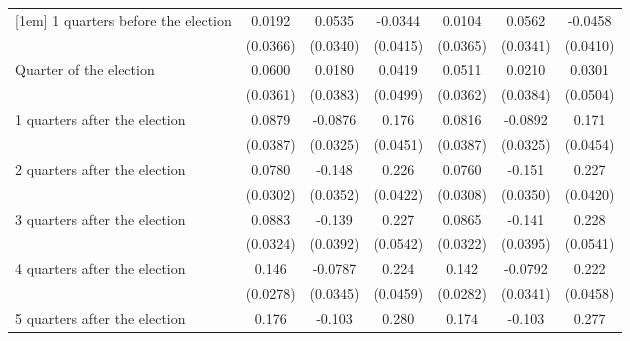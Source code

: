 \begin{table}[!ht]
\begin{tabular}{l*{6}{c}}
[1em]
 1 quarters before the election&      0.0192         &      0.0535         &     -0.0344         &      0.0104         &      0.0562         &     -0.0458         \\
                    &    (0.0366)         &    (0.0340)         &    (0.0415)         &    (0.0365)         &    (0.0341)         &    (0.0410)         \\
[1em]
Quarter of the election&      0.0600         &      0.0180         &      0.0419         &      0.0511         &      0.0210         &      0.0301         \\
                    &    (0.0361)         &    (0.0383)         &    (0.0499)         &    (0.0362)         &    (0.0384)         &    (0.0504)         \\
[1em]
 1 quarters after the election&      0.0879\sym{*}  &     -0.0876\sym{**} &       0.176\sym{***}&      0.0816\sym{*}  &     -0.0892\sym{**} &       0.171\sym{***}\\
                    &    (0.0387)         &    (0.0325)         &    (0.0451)         &    (0.0387)         &    (0.0325)         &    (0.0454)         \\
[1em]
 2 quarters after the election&      0.0780\sym{**} &      -0.148\sym{***}&       0.226\sym{***}&      0.0760\sym{*}  &      -0.151\sym{***}&       0.227\sym{***}\\
                    &    (0.0302)         &    (0.0352)         &    (0.0422)         &    (0.0308)         &    (0.0350)         &    (0.0420)         \\
[1em]
 3 quarters after the election&      0.0883\sym{**} &      -0.139\sym{***}&       0.227\sym{***}&      0.0865\sym{**} &      -0.141\sym{***}&       0.228\sym{***}\\
                    &    (0.0324)         &    (0.0392)         &    (0.0542)         &    (0.0322)         &    (0.0395)         &    (0.0541)         \\
[1em]
 4 quarters after the election&       0.146\sym{***}&     -0.0787\sym{*}  &       0.224\sym{***}&       0.142\sym{***}&     -0.0792\sym{*}  &       0.222\sym{***}\\
                    &    (0.0278)         &    (0.0345)         &    (0.0459)         &    (0.0282)         &    (0.0341)         &    (0.0458)         \\
[1em]
 5 quarters after the election&       0.176\sym{***}&      -0.103\sym{**} &       0.280\sym{***}&       0.174\sym{***}&      -0.103\sym{**} &       0.277\sym{***}\\

\end{tabular}
\end{table}
